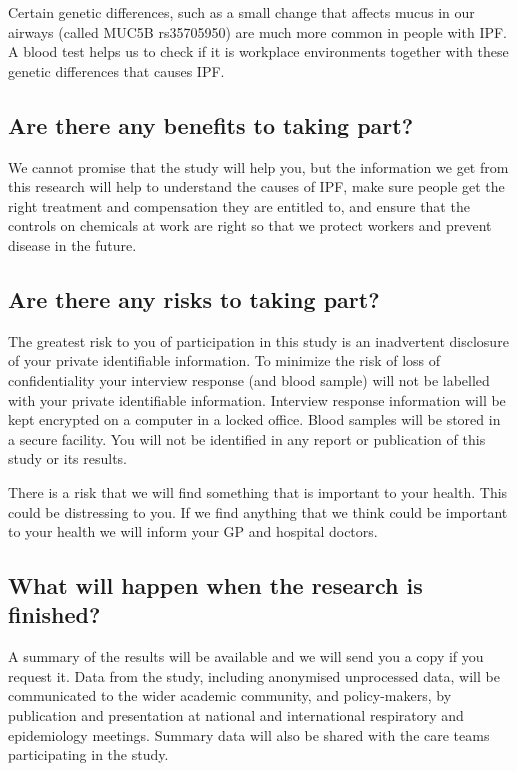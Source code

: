 \documentclass[a4paper,10pt]{article}
\begin{document}
Certain genetic differences, such as a small change that affects mucus in our airways (called MUC5B rs35705950) are much more common in people with IPF. A blood test helps us to check if it is workplace environments together with these genetic differences that causes IPF.   


\subsection*{Are there any benefits to taking part?}

We cannot promise that the study will help you, but the information we get from this research will help to understand the causes of IPF, make sure people get the right treatment and compensation they are entitled to, and ensure that the controls on chemicals at work are right so that we protect workers and prevent disease in the future.

\subsection*{Are there any risks to taking part?}

The greatest risk to you of participation in this study is an inadvertent disclosure of your private identifiable information. To minimize the risk of loss of confidentiality your interview response (and blood sample) will not be labelled with your private identifiable information. Interview response information will be kept encrypted on a computer in a locked office. Blood samples will be stored in a secure facility. You will not be identified in any report or publication of this study or its results.

There is a risk that we will find something that is important to your health. This could be distressing to you. If we find anything that we think could be important to your health we will inform your GP and hospital doctors. 

\subsection*{What will happen when the research is finished?}

A summary of the results will be available and we will send you a copy if you request it. Data from the study, including anonymised unprocessed data, will be communicated to the wider academic community, and policy-makers, by publication and presentation at national and international respiratory and epidemiology meetings. Summary data will also be shared with the care teams participating in the study. 
\end{document}
